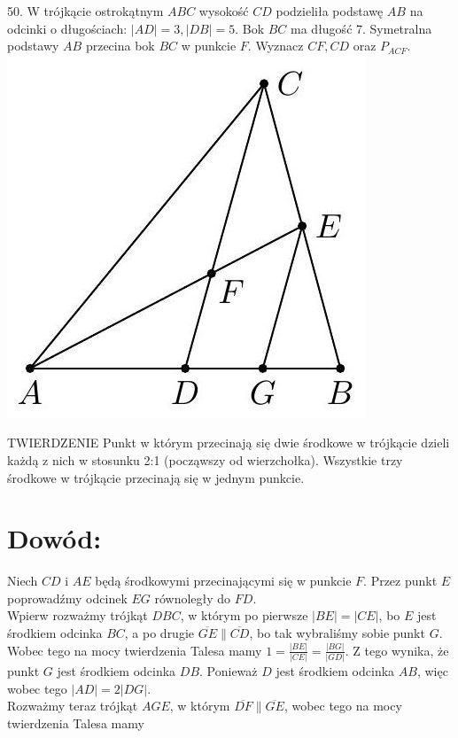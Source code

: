 \documentclass[10pt]{article}
\begin{document}
50. W trójkącie ostrokątnym \(A B C\) wysokość \(C D\) podzieliła podstawę \(A B\) na odcinki o długościach: \(|A D|=3,|D B|=5\). Bok \(B C\) ma długość 7. Symetralna podstawy \(A B\) przecina bok \(B C\) w punkcie \(F\). Wyznacz \(C F, C D\) oraz \(P_{A C F}\).\\
\includegraphics[max width=\textwidth, center]{2024_11_21_e9b4faa005d5be2cc318g-018}

TWIERDZENIE Punkt w którym przecinają się dwie środkowe w trójkącie dzieli każdą z nich w stosunku 2:1 (począwszy od wierzchołka). Wszystkie trzy środkowe w trójkącie przecinają się w jednym punkcie.

\section*{Dowód:}
Niech \(C D\) i \(A E\) będą środkowymi przecinającymi się w punkcie \(F\). Przez punkt \(E\) poprowadźmy odcinek \(E G\) równoległy do \(F D\).\\
Wpierw rozważmy trójkąt \(D B C\), w którym po pierwsze \(|B E|=|C E|\), bo \(E\) jest środkiem odcinka \(B C\), a po drugie \(\overline{G E} \| \overline{C D}\), bo tak wybraliśmy sobie punkt \(G\). Wobec tego na mocy twierdzenia Talesa mamy \(1=\frac{|B E|}{|C E|}=\frac{|B G|}{|G D|}\). Z tego wynika, że punkt \(G\) jest środkiem odcinka \(D B\). Ponieważ \(D\) jest środkiem odcinka \(A B\), więc wobec tego \(|A D|=2|D G|\).\\
Rozważmy teraz trójkąt \(A G E\), w którym \(\overline{D F} \| \overline{G E}\), wobec tego na mocy\\
twierdzenia Talesa mamy
\end{document}
